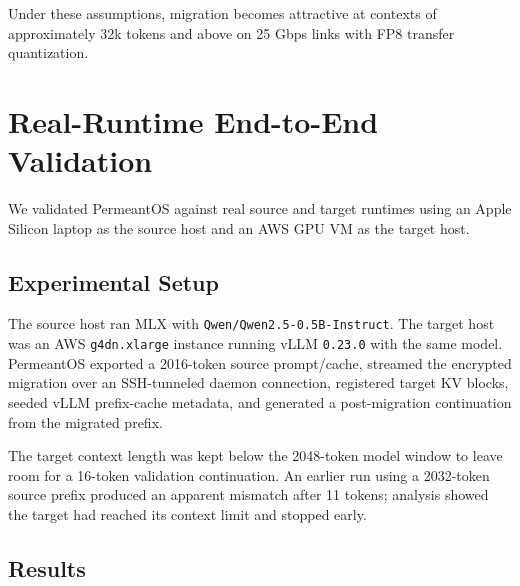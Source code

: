 \documentclass[11pt]{article}
\begin{document}
Under these assumptions, migration becomes attractive at contexts of approximately 32k tokens and above on 25 Gbps links with FP8 transfer quantization.

\section{Real-Runtime End-to-End Validation}

We validated PermeantOS against real source and target runtimes using an Apple Silicon laptop as the source host and an AWS GPU VM as the target host.

\subsection{Experimental Setup}

The source host ran MLX with \texttt{Qwen/Qwen2.5-0.5B-Instruct}. The target host was an AWS \texttt{g4dn.xlarge} instance running vLLM \texttt{0.23.0} with the same model. PermeantOS exported a 2016-token source prompt/cache, streamed the encrypted migration over an SSH-tunneled daemon connection, registered target KV blocks, seeded vLLM prefix-cache metadata, and generated a post-migration continuation from the migrated prefix.

The target context length was kept below the 2048-token model window to leave room for a 16-token validation continuation. An earlier run using a 2032-token source prefix produced an apparent mismatch after 11 tokens; analysis showed the target had reached its context limit and stopped early.

\subsection{Results}
\end{document}
